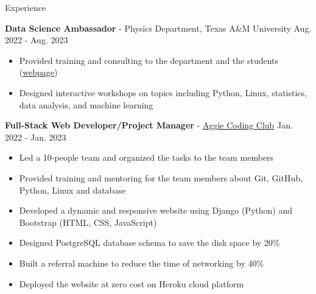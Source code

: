 \documentclass{resume}
\begin{document}
\begin{rSection}{Experience}
    \item \textbf{Data Science Ambassador} - Physics Department, Texas A\&M University \hfill Aug. 2022 - Aug. 2023
        \begin{itemize}
        \item Provided training and consulting to the department and the students (\href{https://noctildon.github.io/DS_ambassador/index.html}{webpage})
        \item Designed interactive workshops on topics including Python, Linux, statistics, data analysis, and machine learning
        \end{itemize}

    \item \textbf{Full-Stack Web Developer/Project Manager} - \href{https://aggiecodingclub.com}{Aggie Coding Club} \hfill Jan. 2022 - Jan. 2023
        \begin{itemize}
            \item Led a 10-people team and organized the tasks to the team members
            \item Provided training and mentoring for the team members about Git, GitHub, Python, Linux and database
            \item Developed a dynamic and responsive website using Django (Python) and Bootstrap (HTML, CSS, JavaScript)
            \item Designed PostgreSQL database schema to save the disk space by 20\%
            \item Built a referral machine to reduce the time of networking by 40\%
            \item Deployed the website at zero cost on Heroku cloud platform
        \end{itemize}

\end{rSection}
\end{document}
